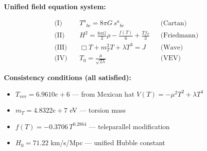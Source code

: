 
\textbf{Unified field equation system:}

\begin{align}
  \text{(I)} \quad & T^a{}_{bc} = 8\pi G \, s^a{}_{bc} && \text{(Cartan)} \\
  \text{(II)} \quad & H^2 = \frac{8\pi G}{3}\rho - \frac{f(T)}{6} + \frac{Tf_T}{3} && \text{(Friedmann)} \\
  \text{(III)} \quad & \Box T + m_T^2 T + \lambda T^3 = J && \text{(Wave)} \\
  \text{(IV)} \quad & T_0 = \frac{\mu}{\sqrt{2\lambda}} && \text{(VEV)}
\end{align}

\textbf{Consistency conditions (all satisfied):}
\begin{itemize}
  \item $T_{\text{vev}} = 6.9610e+6$ — from Mexican hat $V(T) = -\mu^2 T^2 + \lambda T^4$
  \item $m_T = 4.8322e+7$ eV — torsion mass
  \item $f(T) = -0.3706 \, T^{0.2864}$ — teleparallel modification
  \item $H_0 = 71.22$ km/s/Mpc — unified Hubble constant
\end{itemize}